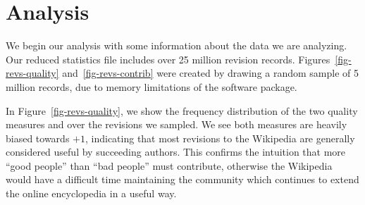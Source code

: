 \section{Analysis}

We begin our analysis with some information about the data
we are analyzing.
Our reduced statistics file includes over 25 million revision
records.
Figures~\ref{fig-revs-quality} and~\ref{fig-revs-contrib} were
created by drawing a random sample of 5 million records,
due to memory limitations of the software package.

In Figure~\ref{fig-revs-quality}, we show the frequency distribution
of the two quality measures
 and  over the revisions we sampled.
We see both measures are heavily biased towards $+1$, indicating that
most revisions to the Wikipedia are generally considered useful
by succeeding authors.
This confirms the intuition that more ``good people'' than
``bad people'' must contribute, otherwise the Wikipedia would
have a difficult time maintaining the community which
continues to extend the online encyclopedia in a useful way.
%
